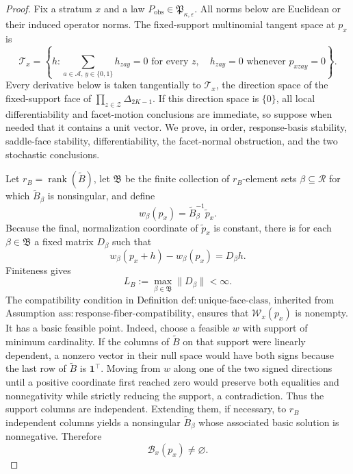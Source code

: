 \documentclass{article}
\begin{document}
\begin{proof}
Fix a stratum \(x\) and a law \(P_{\mathrm{obs}}\in\mathfrak P_{\kappa,\varepsilon}\).  All norms below are Euclidean or their induced operator norms.  The fixed-support multinomial tangent space at \(p_x\) is
\[
 \mathcal T_x
 =\left\{h:\sum_{a\in\mathcal A,\,y\in\{0,1\}}h_{zay}=0
       \text{ for every }z,\quad
       h_{zay}=0\text{ whenever }p_{xzay}=0\right\}.
 \tag{1}
\]
Every derivative below is taken tangentially to \(\mathcal T_x\), the direction space of the fixed-support face of \(\prod_{z\in\mathcal Z}\Delta_{2K-1}\).  If this direction space is \(\{0\}\), all local differentiability and facet-motion conclusions are immediate, so suppose when needed that it contains a unit vector.  We prove, in order, response-basis stability, saddle-face stability, differentiability, the facet-normal obstruction, and the two stochastic conclusions.

Let \(r_B=\operatorname{rank}(\widetilde B)\), let \(\mathfrak B\) be the finite collection of \(r_B\)-element sets \(\beta\subseteq\mathcal R\) for which \(\widetilde B_\beta\) is nonsingular, and define
\[
 w_\beta(p_x)=\widetilde B_\beta^{-1}\widetilde p_x.
\]
Because the final, normalization coordinate of \(\widetilde p_x\) is constant, there is for each \(\beta\in\mathfrak B\) a fixed matrix \(D_\beta\) such that
\[
 w_\beta(p_x+h)-w_\beta(p_x)=D_\beta h.
 \tag{2}
\]
Finiteness gives
\[
 L_B:=\max_{\beta\in\mathfrak B}\|D_\beta\|<\infty.
 \tag{3}
\]
The compatibility condition in Definition \(\mathrm{def{:}unique\mbox{-}face\mbox{-}class}\), inherited from Assumption \(\mathrm{ass{:}response\mbox{-}fiber\mbox{-}compatibility}\), ensures that \(\mathcal W_x(p_x)\) is nonempty.  It has a basic feasible point.  Indeed, choose a feasible \(w\) with support of minimum cardinality.  If the columns of \(\widetilde B\) on that support were linearly dependent, a nonzero vector in their null space would have both signs because the last row of \(\widetilde B\) is \(\mathbf 1^\top\).  Moving from \(w\) along one of the two signed directions until a positive coordinate first reached zero would preserve both equalities and nonnegativity while strictly reducing the support, a contradiction.  Thus the support columns are independent.  Extending them, if necessary, to \(r_B\) independent columns yields a nonsingular \(\widetilde B_\beta\) whose associated basic solution is nonnegative.  Therefore
\[
 \mathcal B_x(p_x)\neq\varnothing.
 \tag{4}
\]


\end{proof}
\end{document}
